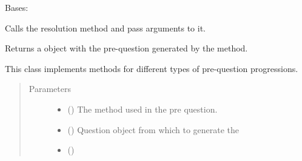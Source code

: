 \documentclass[letterpaper,10pt,english]{sphinxmanual}
\begin{document}
\begin{fulllineitems}
\label{\detokenize{birdears:birdears.prequestion.PreQuestion}}
Bases: 

\begin{fulllineitems}
\label{\detokenize{birdears:birdears.prequestion.PreQuestion.__call__}}
Calls the resolution method and pass arguments to it.

Returns a  object with the pre-question generated by
the method.

\end{fulllineitems}


\begin{fulllineitems}
\label{\detokenize{birdears:birdears.prequestion.PreQuestion.__init__}}
This class implements methods for different types of pre-question
progressions.
\begin{quote}\begin{description}
\item[{Parameters}] \leavevmode\begin{itemize}
\item {} 
 () \textendash{} The method used in the pre question.

\item {} 
 () \textendash{} Question object from which to generate the

\item {} 
 () \textendash{} 

\end{itemize}

\end{description}\end{quote}

\end{fulllineitems}


\end{fulllineitems}
\end{document}
